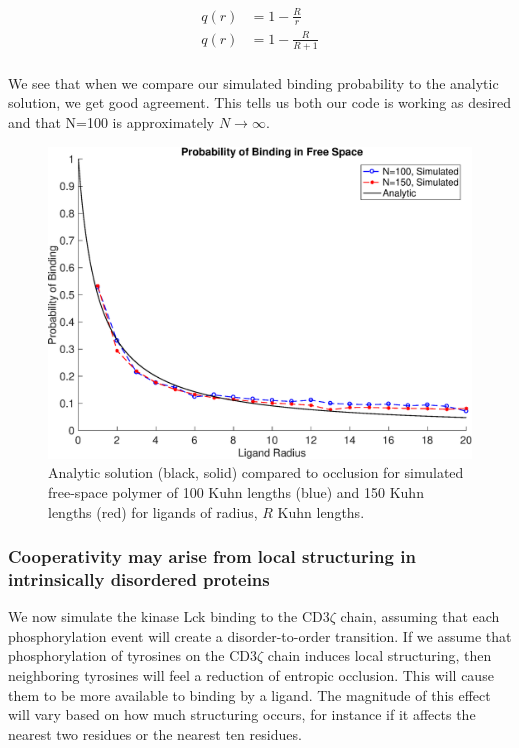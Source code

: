 \documentclass[../../AdvancementSummary.tex]{subfiles}
\begin{document}
 \begin{align*}\label{eq: analyticSolution}
q(r) &= 1-\frac{R}{r}\\
q(r) &= 1-\frac{R}{R+1} \\
 \end{align*}
 
 We see that when we compare our simulated binding probability to the analytic solution, we get good agreement. This tells us both our code is working as desired and that N=100 is approximately $N \rightarrow \infty$.

 \begin{figure}[H]
 \begin{center}
 \includegraphics[width=0.7\linewidth]{ResultsFigures/General/Analytic/BindingVSAnalyticN100N150.eps}
 \end{center}
  \caption{Analytic solution (black, solid) compared to occlusion for simulated free-space polymer of 100 Kuhn lengths (blue) and 150 Kuhn lengths (red) for ligands of radius, $R$ Kuhn lengths. \label{fig: AnalyticBinding}}
 \end{figure}



\subsubsection{Cooperativity may arise from local structuring in intrinsically disordered proteins}

We now simulate the kinase Lck binding to the CD3$\zeta$ chain, assuming that each phosphorylation event will create a disorder-to-order transition. If we assume that phosphorylation of tyrosines on the CD3$\zeta$ chain induces local structuring, then neighboring tyrosines will feel a reduction of entropic occlusion. This will cause them to be more available to binding by a ligand. The magnitude of this effect will vary based on how much structuring occurs, for instance if it affects the nearest two residues or the nearest ten residues. 
\end{document}
